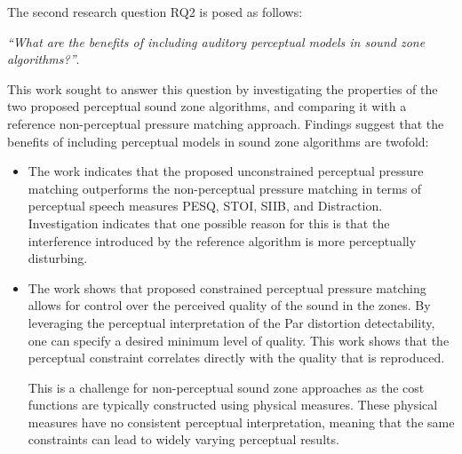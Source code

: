 The second research question RQ2 is posed as follows:
\begin{center}
    {\textit{``What are the benefits of including auditory perceptual models in sound zone algorithms?''}}.\\
\end{center}
This work sought to answer this question by investigating the properties of the two proposed perceptual sound zone 
algorithms, and comparing it with a reference non-perceptual pressure matching approach.
Findings suggest that the benefits of including perceptual models in sound zone algorithms are twofold:
\begin{itemize}
    \item The work indicates that the proposed unconstrained perceptual pressure matching outperforms 
        the non-perceptual pressure matching in terms of perceptual speech measures PESQ, STOI, SIIB, and Distraction.
        Investigation indicates that one possible reason for this is that the interference introduced by the
        reference algorithm is more perceptually disturbing.
    \item The work shows that proposed constrained perceptual pressure matching allows for control over the 
        perceived quality of the sound in the zones.
        By leveraging the perceptual interpretation of the Par distortion detectability, one can specify a desired minimum
        level of quality.
        This work shows that the perceptual constraint correlates directly with the quality that is reproduced.

        This is a challenge for non-perceptual sound zone approaches as the cost functions are typically constructed
        using physical measures.
        These physical measures have no consistent perceptual interpretation, meaning that the same constraints can 
        lead to widely varying perceptual results.
\end{itemize}
